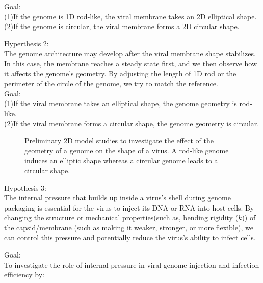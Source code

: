 \documentclass[12pt]{article}
\begin{document}
\begin{flushleft}
\noindent Goal:\\
	(1)If the genome is 1D rod-like, the viral membrane takes an 2D elliptical shape.\\
	(2)If the genome is circular, the viral membrane forms a 2D circular shape.
	
\noindent Hyperthesis 2:\\
The genome architecture may develop after the viral membrane shape stabilizes. In this case, the membrane reaches a steady state first, and we then observe how it affects the genome’s geometry. By adjusting the length of 1D rod or the perimeter of the circle of the genome, we try to match the reference.\\ 
\noindent Goal:\\
	(1)If the viral membrane takes an elliptical shape, the genome geometry is rod-like\cite{harish2021entomopathogenic}.	\\
	(2)If the viral membrane forms a circular shape, the genome geometry is circular.
		

	
\begin{figure}[!ht]
  \centering
  \caption{Preliminary 2D model studies to
investigate the effect of the geometry of a
genome on the shape of a virus. A rod-like
genome induces an elliptic shape whereas a
circular genome leads to a circular shape.}
\end{figure}
	
	
\noindent Hypothesis 3:\\
The internal pressure that builds up inside a virus’s shell during genome packaging is essential for the virus to inject its DNA or RNA into host cells. By changing the structure or mechanical properties(such as, bending rigidity ($k$)) of the capsid/membrane (such as making it weaker, stronger, or more flexible), we can control this pressure and potentially reduce the virus’s ability to infect cells.

\noindent Goal:\\
\noindent To investigate the role of internal pressure in viral genome injection and infection efficiency by:


\end{flushleft}
\end{document}
